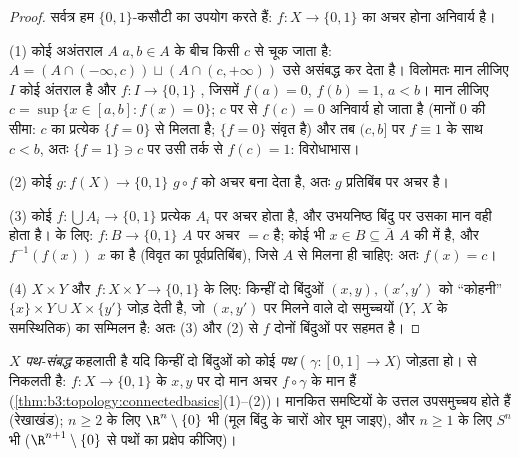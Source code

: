 \begin{proof}
सर्वत्र हम $\{0,1\}$-कसौटी का उपयोग करते हैं:  $f \colon X \to
\{0,1\}$ का अचर होना
अनिवार्य है।

(1) कोई अअंतराल $A$ $a, b \in A$ के बीच किसी $c$ से चूक जाता है:
$A = (A \cap (-\infty, c)) \sqcup (A \cap (c, +\infty))$
उसे असंबद्ध कर देता है। विलोमतः मान लीजिए $I$ कोई अंतराल है और
$f \colon I
\to \{0,1\}$ , जिसमें $f(a) = 0$, $f(b) = 1$, $a < b$। मान लीजिए $c = \sup\{x \in [a,b] : f(x) = 0\}$; $c$
पर  से $f(c) = 0$ अनिवार्य हो जाता है (मानों $0$ की सीमा:
$c$ का प्रत्येक  $\{f = 0\}$ से मिलता है; $\{f=0\}$ संवृत है) और
तब $(c, b]$ पर $f \equiv 1$ के साथ $c < b$, अतः $\{f = 1\} \ni c$ पर उसी  तर्क से
$f(c) = 1$: विरोधाभास।

(2) कोई  $g \colon f(X) \to \{0,1\}$ $g \circ f$ को अचर बना देता है, अतः $g$ प्रतिबिंब
पर अचर है।

(3) कोई  $f\colon \bigcup A_i \to \{0,1\}$ प्रत्येक $A_i$ पर अचर होता है, और उभयनिष्ठ
बिंदु पर उसका मान वही होता है।  के लिए: $f \colon B \to \{0,1\}$ $A$ पर अचर
$= c$ है; कोई भी $x \in B \subseteq \bar A$ $A$ की  में है, और $f^{-1}
(f(x))$ $x$
का  है (विवृत का पूर्वप्रतिबिंब), जिसे $A$ से मिलना ही
चाहिए: अतः $f(x) = c$।

(4) $X \times Y$ और $f\colon X\times Y \to \{0,1\}$ के लिए: किन्हीं दो बिंदुओं $(x,y), (x',y')$ को ``कोहनी''
$\{x\}\times Y \cup X \times \{y'\}$ जोड़ देती है, जो $(x, y')$ पर मिलने वाले दो  समुच्चयों
($Y$, $X$ के समस्थितिक) का सम्मिलन है: अतः (3) और (2) से
$f$ दोनों बिंदुओं पर सहमत है।
\end{proof}

\begin{definition}\label{def:b3:topology:pathconnected}
$X$ \emph{पथ-संबद्ध} कहलाती है यदि
किन्हीं दो बिंदुओं को कोई \emph{पथ} ( $\gamma
\colon [0,1] \to X$) जोड़ता हो।
 से  निकलती है:  $f \colon X \to \{0,1\}$ के $x, y$ पर दो मान
अचर $f\circ\gamma$ के मान हैं (\cref{thm:b3:topology:connectedbasics}(1)--(2))। मानकित समष्टियों के उत्तल
उपसमुच्चय  होते हैं (रेखाखंड); $n \geq 2$ के लिए $\R^n
\setminus \{0\}$ भी
(मूल बिंदु के चारों ओर घूम जाइए), और $n \geq 1$ के लिए $S^n$ भी
($\R^{n+1}\setminus
\{0\}$ से पथों का प्रक्षेप कीजिए)।
\end{definition}

